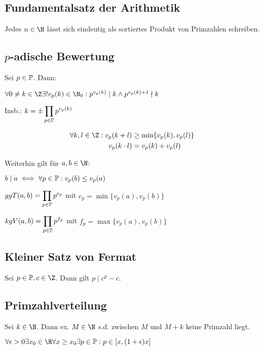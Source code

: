 \subsection*{Fundamentalsatz der Arithmetik}

Jedes $n \in \N$ lässt sich eindeutig als sortiertes Produkt von Primzahlen schreiben.

\subsection*{$p$-adische Bewertung}

Sei $p \in \mathbb{P}$. Dann:

$\forall 0 \neq k \in \Z \exists! v_p(k) \in \N_0 : p^{v_p(k)} \mid k \land p^{v_p(k)+1} \nmid k$

Insb.: $k = \pm \displaystyle\prod_{p \in \mathbb{P}} p^{v_p(k)}$

\vspace*{-4mm}
\begin{align*}
\forall k, l \in \Z: v_p(k+l)   &\geq \min\{v_p(k),v_p(l)\} \\
             v_p(k \cdot l) &= v_p(k) + v_p(l)
\end{align*}

Weiterhin gilt für $a, b \in \N$:

$b \mid a \iff \forall p \in \mathbb{P} : v_p(b) \leq v_p(a)$

$ggT(a,b) = \displaystyle\prod_{p \in \mathbb{P}} p^{e_p}$ mit $e_p = \min\{v_p(a),v_p(b)\}$

$kgV(a,b) = \displaystyle\prod_{p \in \mathbb{P}} p^{f_p}$ mit $f_p = \max\{v_p(a),v_p(b)\}$

\subsection*{Kleiner Satz von Fermat}

Sei $p \in \Primes, c \in \Z$. Dann gilt $p \mid c^p - c$.

\subsection*{Primzahlverteilung}

Sei $k \in \N$. Dann ex. $M \in \N$ s.d. zwischen $M$ und $M+k$ keine Primzahl liegt.

$\forall \epsilon > 0 \exists x_0 \in \R \forall x \geq x_0 \exists p \in \Primes : p \in [x,(1+\epsilon)x]$

\vspace*{2mm}

